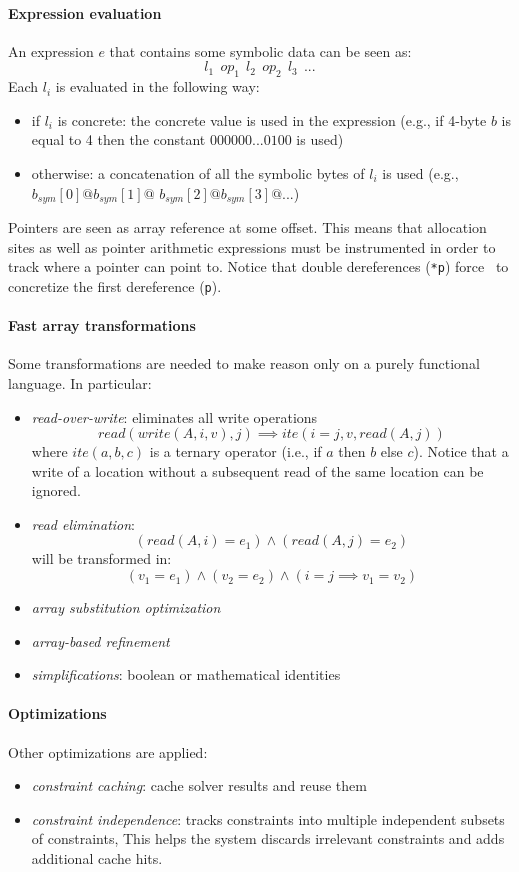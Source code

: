 \paragraph{Expression evaluation} An expression $e$ that contains some symbolic data can be seen as:
\[ l_1~~op_1~~l_2~~op_2~~l_3~~... \]
Each $l_i$ is evaluated in the following way:
\begin{itemize}
  \item if $l_i$ is concrete: the concrete value is used in the expression (e.g., if 4-byte $b$ is equal to 4 then the constant $000000...0100$ is used)
  \item otherwise: a concatenation of all the symbolic bytes of $l_i$ is used (e.g., $b_{sym}[0] @b_{sym}[1] @ $ $b_{sym}[2] @ b_{sym}[3] @ ...$)
\end{itemize}
Pointers are seen as array reference at some offset. This means that allocation sites as well as pointer arithmetic expressions must be instrumented in order to track where a pointer can point to. Notice that double dereferences ({\tt **p}) force~\cite{STP-TR07} to concretize the first dereference ({\tt *p}). 

\paragraph{Fast array transformations} Some transformations are needed to make\cite{STP-TR07} reason only on a purely functional language. In particular:
\begin{itemize}
  \item {\em read-over-write}: eliminates all write operations
    \[ read(write(A, i, v), j) \implies ite(i = j, v, read(A, j)) \]
    where $ite(a,b,c)$ is a ternary operator (i.e., if $a$ then $b$ else $c$). Notice that a write of a location without a subsequent read of the same location can be ignored.
  \item {\em read elimination}:
    \[ (read(A, i) = e_1) \wedge (read(A, j) = e_2) \]
    will be transformed in:
    \[ (v_1 = e_1) \wedge (v_2 = e_2) \wedge (i=j \implies v_1 = v_2) \]
  \item {\em array substitution optimization}
  \item {\em array-based refinement}
  \item {\em simplifications}: boolean or mathematical identities
\end{itemize} 

\paragraph{Optimizations} Other optimizations are applied:
\begin{itemize}
  \item {\em constraint caching}: cache solver results and reuse them
  \item {\em constraint independence}: tracks constraints into multiple independent subsets of constraints, This helps the system discards irrelevant constraints and adds additional cache hits.  
\end{itemize}


